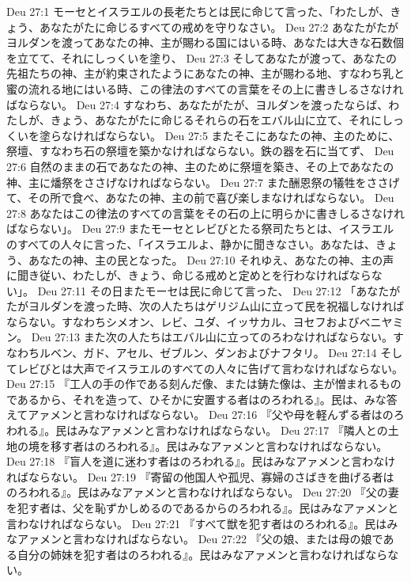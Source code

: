 Deu 27:1  モーセとイスラエルの長老たちとは民に命じて言った、「わたしが、きょう、あなたがたに命じるすべての戒めを守りなさい。
Deu 27:2  あなたがたがヨルダンを渡ってあなたの神、主が賜わる国にはいる時、あなたは大きな石数個を立てて、それにしっくいを塗り、
Deu 27:3  そしてあなたが渡って、あなたの先祖たちの神、主が約束されたようにあなたの神、主が賜わる地、すなわち乳と蜜の流れる地にはいる時、この律法のすべての言葉をその上に書きしるさなければならない。
Deu 27:4  すなわち、あなたがたが、ヨルダンを渡ったならば、わたしが、きょう、あなたがたに命じるそれらの石をエバル山に立て、それにしっくいを塗らなければならない。
Deu 27:5  またそこにあなたの神、主のために、祭壇、すなわち石の祭壇を築かなければならない。鉄の器を石に当てず、
Deu 27:6  自然のままの石であなたの神、主のために祭壇を築き、その上であなたの神、主に燔祭をささげなければならない。
Deu 27:7  また酬恩祭の犠牲をささげて、その所で食べ、あなたの神、主の前で喜び楽しまなければならない。
Deu 27:8  あなたはこの律法のすべての言葉をその石の上に明らかに書きしるさなければならない」。
Deu 27:9  またモーセとレビびとたる祭司たちとは、イスラエルのすべての人々に言った、「イスラエルよ、静かに聞きなさい。あなたは、きょう、あなたの神、主の民となった。
Deu 27:10  それゆえ、あなたの神、主の声に聞き従い、わたしが、きょう、命じる戒めと定めとを行わなければならない」。
Deu 27:11  その日またモーセは民に命じて言った、
Deu 27:12  「あなたがたがヨルダンを渡った時、次の人たちはゲリジム山に立って民を祝福しなければならない。すなわちシメオン、レビ、ユダ、イッサカル、ヨセフおよびベニヤミン。
Deu 27:13  また次の人たちはエバル山に立ってのろわなければならない。すなわちルベン、ガド、アセル、ゼブルン、ダンおよびナフタリ。
Deu 27:14  そしてレビびとは大声でイスラエルのすべての人々に告げて言わなければならない。
Deu 27:15  『工人の手の作である刻んだ像、または鋳た像は、主が憎まれるものであるから、それを造って、ひそかに安置する者はのろわれる』。民は、みな答えてアァメンと言わなければならない。
Deu 27:16  『父や母を軽んずる者はのろわれる』。民はみなアァメンと言わなければならない。
Deu 27:17  『隣人との土地の境を移す者はのろわれる』。民はみなアァメンと言わなければならない。
Deu 27:18  『盲人を道に迷わす者はのろわれる』。民はみなアァメンと言わなければならない。
Deu 27:19  『寄留の他国人や孤児、寡婦のさばきを曲げる者はのろわれる』。民はみなアァメンと言わなければならない。
Deu 27:20  『父の妻を犯す者は、父を恥ずかしめるのであるからのろわれる』。民はみなアァメンと言わなければならない。
Deu 27:21  『すべて獣を犯す者はのろわれる』。民はみなアァメンと言わなければならない。
Deu 27:22  『父の娘、または母の娘である自分の姉妹を犯す者はのろわれる』。民はみなアァメンと言わなければならない。
